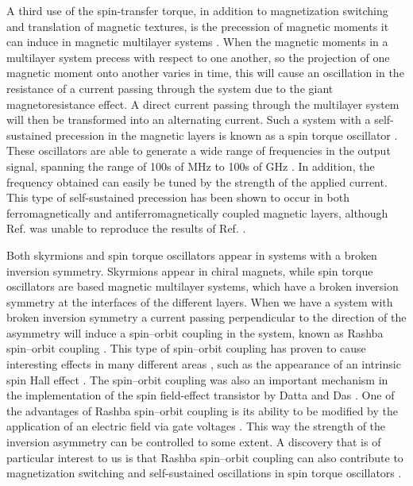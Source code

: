 A third use of the spin-transfer torque, in addition to magnetization switching and translation of magnetic textures, is the precession of magnetic moments it can induce in magnetic multilayer systems \cite{Tsoi2000,Kiselev2003,Rippard2004}. When the magnetic moments in a multilayer system precess with respect to one another, so the projection of one magnetic moment onto another varies in time, this will cause an oscillation in the resistance of a current passing through the system due to the giant magnetoresistance effect. A direct current passing through the multilayer system will then be transformed into an alternating current. Such a system with a self-sustained precession in the magnetic layers is known as a spin torque oscillator \cite{Silva2008,Kim2012STO}. These oscillators are able to generate a wide range of frequencies in the output signal, spanning the range of 100s of MHz to 100s of GHz \cite{Katine2008,Silva2008,Sun2008}. In addition, the frequency obtained can easily be tuned by the strength of the applied current. This type of self-sustained precession has been shown to occur in both ferromagnetically \cite{Zhou2013} and antiferromagnetically \cite{Klein2012} coupled magnetic layers, although Ref. \cite{Zhou2013} was unable to reproduce the results of Ref. \cite{Klein2012}. 

Both skyrmions and spin torque oscillators appear in systems with a broken inversion symmetry. Skyrmions appear in chiral magnets, while spin torque oscillators are based magnetic multilayer systems, which have a broken inversion symmetry at the interfaces of the different layers. When we have a system with broken inversion symmetry a current passing perpendicular to the direction of the asymmetry will induce a spin--orbit coupling in the system, known as Rashba spin--orbit coupling \cite{BychovRashba1984,Heide2006}. This type of spin--orbit coupling has proven to cause interesting effects in many different areas \cite{Manchon2015}, such as the appearance of an intrinsic spin Hall effect \cite{Sinova2004}. The spin--orbit coupling was also an important mechanism in the implementation of the spin field-effect transistor by Datta and Das \cite{DattaDas1990}. One of the advantages of Rashba spin--orbit coupling is its ability to be modified by the application of an electric field via gate voltages \cite{Schultz1996,Nitta1997}. This way the strength of the inversion asymmetry can be controlled to some extent. A discovery that is of particular interest to us is that Rashba spin--orbit coupling can also contribute to magnetization switching and self-sustained oscillations in spin torque oscillators \cite{Miron2011,Duan2014}.


